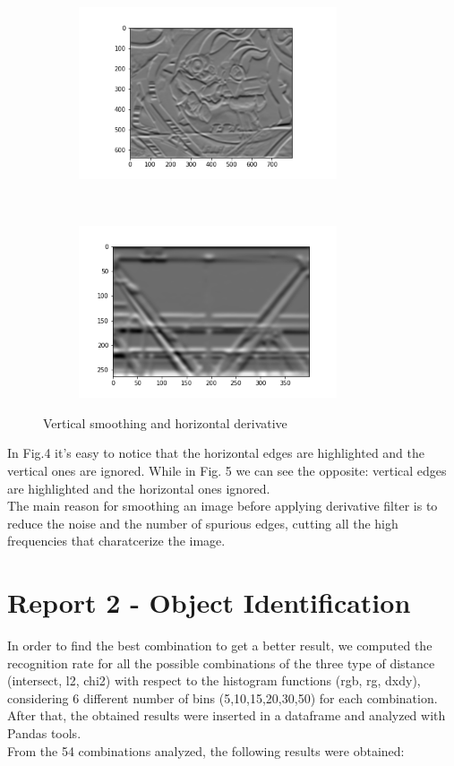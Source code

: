 \documentclass[
	12pt, %
]{fphw}
\begin{document}
\begin{figure}[h!]
    \centering
    \begin{subfigure}[t]{0.5\textwidth}
        \centering
        \includegraphics[height=2in]{img/1e/graf2.png}

    \end{subfigure}%
    ~ 
    \begin{subfigure}[t]{0.4\textwidth}
        \centering
        \includegraphics[height=2in]{img/1e/gantry2.png}

	\end{subfigure}
	\caption{Vertical smoothing and horizontal derivative}
\end{figure}


In Fig.4 it's easy to notice that the horizontal edges are highlighted and the vertical ones are ignored. While in Fig. 5 we can see the opposite: vertical edges are highlighted and the horizontal ones ignored. \\
The main reason for smoothing an image before applying derivative filter is to reduce the noise and the number of spurious edges, cutting all the high frequencies that charatcerize the image.

\newpage
\section*{Report 2 - Object Identification}


In order to find the best combination to get a better result, we computed the recognition rate for all the possible combinations of the three type of distance (intersect, l2, chi2) with respect to the histogram functions (rgb, rg, dxdy), considering 6 different number of bins (5,10,15,20,30,50) for each combination. After that, the obtained results were inserted in a dataframe and analyzed with Pandas tools. \\
From the 54 combinations analyzed, the following results were obtained:\\ \\
\end{document}
